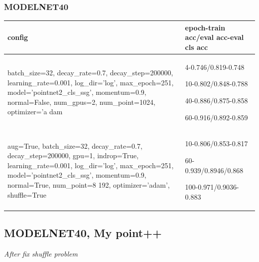 \documentclass{article}
\begin{document}
\subsubsection{MODELNET40}
\begin{tabular}{ |p{8cm}|p{5cm}| }
	\hline
	config & epoch-train acc/eval acc-eval cls acc \\ 
	\hline
	batch\_size=32, decay\_rate=0.7, decay\_step=200000, learning\_rate=0.001, log\_dir='log', max\_epoch=251, model='pointnet2\_cls\_ssg', momentum=0.9, normal=False, num\_gpus=2, num\_point=1024, optimizer='a     dam &4-0.746/0.819-0.748\par 10-0.802/0.848-0.788\par 40-0.886/0.875-0.858\par 60-0.916/0.892-0.859 \\
	\hline
	aug=True, batch\_size=32, decay\_rate=0.7, decay\_step=200000, gpu=1, indrop=True, learning\_rate=0.001, log\_dir='log', max\_epoch=251, model='pointnet2\_cls\_ssg', momentum=0.9, normal=True, num\_point=8     192, optimizer='adam', shuffle=True & 10-0.806/0.853-0.817 \par  60-0.939/0.8946/0.868 \par 100-0.971/0.9036-0.883\\
	\hline

\end{tabular}
\noindent
\subsection{MODELNET40, My point++}	
\emph{After fix shuffle problem}
\end{document}
